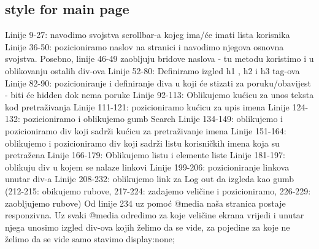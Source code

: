 \documentclass{article}
\begin{document}
\subsection{style for main page}

Linije 9-27: navodimo svojstva scrollbar-a kojeg ima/će imati lista korisnika
\newline\newline
Linije 36-50: pozicioniramo naslov na stranici i navodimo njegova osnovna svojstva. Posebno, linije 46-49 zaobljuju bridove naslova - tu metodu koristimo i u oblikovanju ostalih div-ova
\newline\newline
Linije 52-80: Definiramo izgled \nless h1  \ngtr, \nless h2 \ngtr i \nless h3 \ngtr tag-ova
\newline\newline
Linije 82-90: pozicioniranje i definiranje diva u koji će stizati za poruku/obavijest - biti će hidden dok nema poruke
\newline\newline
Linije 92-113: Oblikujemo kućicu za unos teksta kod pretraživanja
\newline\newline
Linije 111-121: pozicioniramo kućicu za upis imena
\newline\newline
Linije 124-132: pozicioniramo i oblikujemo gumb Search
\newline\newline
Linije 134-149: oblikujemo i pozicioniramo div koji sadrži kućicu za pretraživanje imena
\newline\newline
Linije 151-164: oblikujemo i pozicioniramo div koji sadrži listu korisničkih imena koja su pretražena
\newline\newline
Linije 166-179: Oblikujemo listu i elemente liste
\newline\newline
Linije 181-197: oblikuju div u kojem se nalaze linkovi
\newline\newline
Linije 199-206: pozicioniranje linkova unutar div-a
\newline\newline
Linije 208-232: oblikujemo link za Log out da izgleda kao gumb \newline(212-215: obikujemo rubove, 217-224: zadajemo veličine i pozicioniramo, 226-229: zaobljujemo rubove)
\newline\newline
Od linije 234 uz pomoć @media naša stranica postaje responzivna.
Uz svaki @media odredimo za koje veličine ekrana vrijedi i unutar njega unosimo izgled div-ova kojih želimo da se vide, za pojedine za koje ne želimo da se vide samo stavimo display:none;
\end{document}
